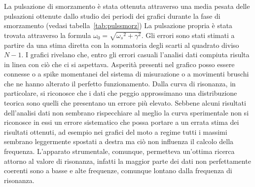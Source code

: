 La pulsazione di smorzamento è stata ottenuta attraverso una media pesata delle pulsazioni ottenute dallo studio dei periodi dei
grafici durante la fase di smorzamento (vedasi tabella~\ref{tab:pulssmorz})
La pulsazione propria è stata trovata attraverso la formula $\omega_0 =\sqrt{{\omega_s} ^ 2 + \gamma ^ 2 }$.
Gli errori sono stati stimati a partire da una stima diretta con la sommatoria degli scarti al quadrato diviso $N-1$.
I grafici rivelano che, entro gli errori casuali l'analisi dati compiuta risulta in linea con ciò che ci si aspettava. Asperità 
presenti nel grafico posso essere connesse o a spike momentanei del sistema di misurazione o a movimenti bruschi che ne hanno
 alterato il perfetto funzionamento. Dalla curva di risonanza, in particolare, si riconosce che i dati che peggio approssimano una
 distribuzione teorica sono quelli che presentano un errore più elevato. Sebbene alcuni risultati dell'analisi dati
 non sembrano rispecchiare al meglio la curva sperimentale non si riconosce in essi un errore sistematico che possa portare a un errata
 stima dei risultati ottenuti, ad esempio nei grafici del moto a regime tutti i massimi sembrano leggermente spostati a destra ma ciò non influenza il calcolo
 della frequenza. L'apparato strumentale, comunque, permetteva un'ottima
 ricerca attorno al valore di risonanza, infatti la maggior parte dei dati non perfettamente coerenti sono a basse e alte frequenze,
 comunque lontano dalla frequenza di risonanza.

